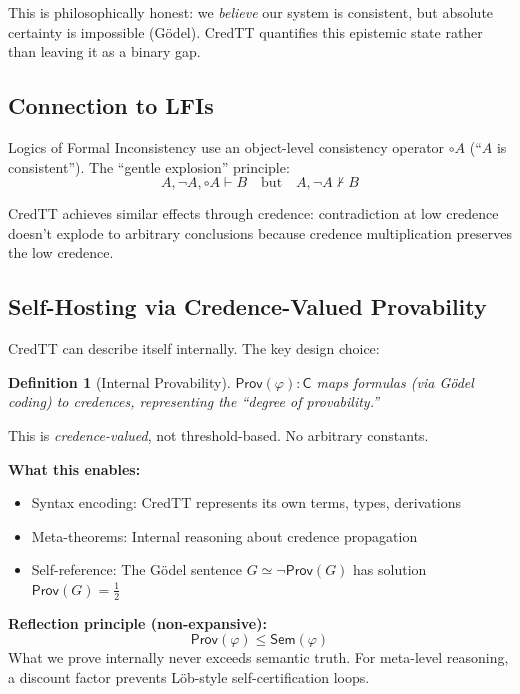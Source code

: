 \documentclass[11pt,a4paper]{article}
\newtheorem{definition}{Definition}[section]
\newcommand{\C}{\mathsf{C}}
\newcommand{\negc}{\neg}
\begin{document}
This is philosophically honest: we \emph{believe} our system is consistent, but absolute certainty is impossible (G\"odel). CredTT quantifies this epistemic state rather than leaving it as a binary gap.

\subsection{Connection to LFIs}

Logics of Formal Inconsistency \citep{carnielli2016paraconsistent} use an object-level consistency operator $\circ A$ (``$A$ is consistent''). The ``gentle explosion'' principle:
\[
A, \neg A, \circ A \vdash B \quad \text{but} \quad A, \neg A \not\vdash B
\]

CredTT achieves similar effects through credence: contradiction at low credence doesn't explode to arbitrary conclusions because credence multiplication preserves the low credence.

\subsection{Self-Hosting via Credence-Valued Provability}

CredTT can describe itself internally. The key design choice:

\begin{definition}[Internal Provability]
$\mathsf{Prov}(\varphi) : \C$ maps formulas (via G\"odel coding) to credences, representing the ``degree of provability.''
\end{definition}

This is \emph{credence-valued}, not threshold-based. No arbitrary constants.

\textbf{What this enables:}
\begin{itemize}
    \item Syntax encoding: CredTT represents its own terms, types, derivations
    \item Meta-theorems: Internal reasoning about credence propagation
    \item Self-reference: The G\"odel sentence $G \simeq \negc\mathsf{Prov}(G)$ has solution $\mathsf{Prov}(G) = \frac{1}{2}$
\end{itemize}

\textbf{Reflection principle (non-expansive):}
\[
\mathsf{Prov}(\varphi) \leq \mathsf{Sem}(\varphi)
\]
What we prove internally never exceeds semantic truth. For meta-level reasoning, a discount factor prevents L\"ob-style self-certification loops.
\end{document}
